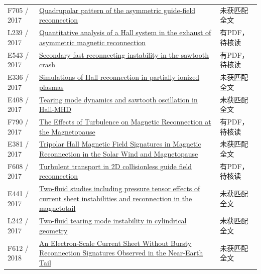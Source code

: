 \begin{longtable}{P{24mm}P{97mm}P{27mm}}
F705 / 2017 & \href{https://doi.org/10.1002/2016ja023666}{Quadrupolar pattern of the asymmetric guide‐field reconnection} & 未获匹配全文\\

L239 / 2017 & \href{https://doi.org/10.1002/2016ja023620}{Quantitative analysis of a Hall system in the exhaust of asymmetric magnetic reconnection} & 有PDF，待核读\\

E543 / 2017 & \href{https://doi.org/10.1063/1.4973328}{Secondary fast reconnecting instability in the sawtooth crash} & 有PDF，待核读\\

E336 / 2017 & \href{http://ui.adsabs.harvard.edu/abs/2017EGUGA..1915103I/abstract}{Simulations of Hall reconnection in partially ionized plasmas} & 未获匹配全文\\

E408 / 2017 & \href{http://absimage.aps.org/image/DPP17/MWS_DPP17-2017-000073.pdf}{Tearing mode dynamics and sawtooth oscillation in Hall-MHD} & 未获匹配全文\\

F790 / 2017 & \href{https://doi.org/10.13016/m24q7qq78}{The Effects of Turbulence on Magnetic Reconnection at the Magnetopause} & 有PDF，待核读\\

E381 / 2017 & \href{https://ui.adsabs.harvard.edu/abs/2017shin.confE..42C/abstract}{Tripolar Hall Magnetic Field Signatures in Magnetic Reconnection in the Solar Wind and Magnetopause} & 未获匹配全文\\

F608 / 2017 & \href{https://doi.org/10.1063/1.4975086}{Turbulent transport in 2D collisionless guide field reconnection} & 有PDF，待核读\\

E441 / 2017 & \href{https://ui.adsabs.harvard.edu/abs/2017AGUFMSM11C2328N/abstract}{Two-fluid studies including pressure tensor effects of current sheet instabilities and reconnection in the magnetotail} & 未获匹配全文\\

L242 / 2017 & \href{https://doi.org/10.1063/1.4986116}{Two-fluid tearing mode instability in cylindrical geometry} & 未获匹配全文\\

F612 / 2018 & \href{https://doi.org/10.1002/2017gl076330}{An Electron‐Scale Current Sheet Without Bursty Reconnection Signatures Observed in the Near‐Earth Tail} & 未获匹配全文\\


\end{longtable}
